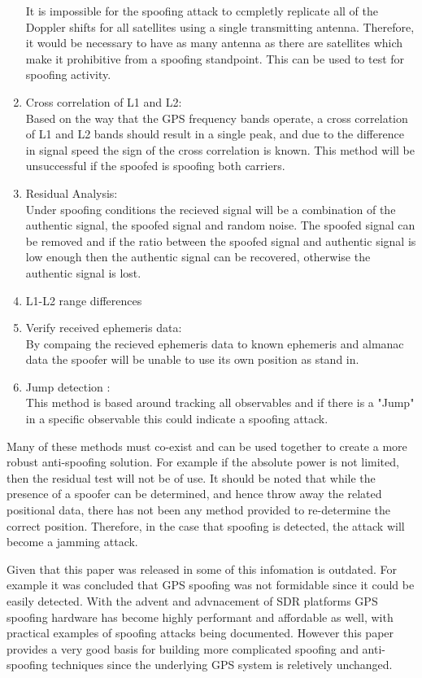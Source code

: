 \begin{enumerate}
    It is impossible for the spoofing attack to ccmpletly replicate all of the Doppler shifts for all satellites using a single transmitting antenna.
    Therefore, it would be necessary to have as many antenna as there are satellites which make it prohibitive from a spoofing standpoint. This can be
    used to test for spoofing activity.
    \item Cross correlation of L1 and L2: \\
    Based on the way that the GPS frequency bands operate, a cross correlation of L1 and L2 bands should result in a single peak, and due to the 
    difference in signal speed the sign of the cross correlation is known. This method will be unsuccessful if the spoofed is spoofing both carriers.
    \item Residual Analysis: \\
    Under spoofing conditions the recieved signal will be a combination of the authentic signal, the spoofed signal and random noise. The spoofed signal
    can be removed and if the ratio between the spoofed signal and authentic signal is low enough then the authentic signal can be recovered, otherwise
    the authentic signal is lost. 
    \item L1-L2 range differences
    \item Verify received ephemeris data: \\
    By compaing the recieved ephemeris data to known ephemeris and almanac data the spoofer will be unable to use its own position as stand in. 
    \item Jump detection : \\
    This method is based around tracking all observables and if there is a "Jump" in a specific observable this could indicate a spoofing attack.
\end{enumerate} 
Many of these methods must co-exist and can be used together to create a more robust anti-spoofing solution. For example if the absolute power is 
not limited, then the residual test will not be of use. It should be noted that while the presence of a spoofer can be determined, and hence 
throw away the related positional data, there has not been any method provided to re-determine the correct position. Therefore, in the case that
spoofing is detected, the attack will become a jamming attack.

Given that this paper was released in \citeyear{RN11} some of this infomation is outdated. For example it was concluded that GPS spoofing was not formidable
since it could be easily detected. With the advent and advnacement of SDR platforms
GPS spoofing hardware has become highly performant and affordable as well, with practical examples of spoofing attacks being  documented. 
However this paper provides a very good basis for building more complicated spoofing and anti-spoofing techniques since the underlying GPS system is
reletively unchanged. 

